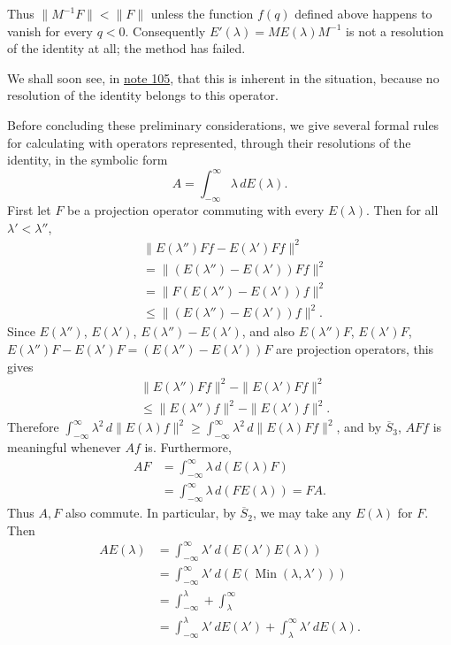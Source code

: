 \documentclass[fontsize=13pt,twoside,openany,headings=normal,parskip=false,bookmarkpackage=false,DIV=calc]{scrbook}
\begin{document}
\hypertarget{origpage-73}{}%
Thus $\|M^{-1}F\|<\|F\|$ unless the function $f(q)$ defined above happens to vanish for every $q<0$. Consequently $E'(\lambda)=ME(\lambda)M^{-1}$ is not a resolution of the identity at all; the method has failed.

We shall soon see, in \hyperlink{note-105}{note 105}, that this is inherent in the situation, because no resolution of the identity belongs to this operator.

Before concluding these preliminary considerations, we give several formal rules for calculating with operators represented, through their resolutions of the identity, in the symbolic form
\[
A=\int_{-\infty}^{\infty}\lambda\,dE(\lambda).
\]
First let $F$ be a projection operator commuting with every $E(\lambda)$. Then for all $\lambda'<\lambda''$,
\begin{align*}
&\|E(\lambda'')Ff-E(\lambda')Ff\|^2\\
&=\|(E(\lambda'')-E(\lambda'))Ff\|^2\\
&=\|F(E(\lambda'')-E(\lambda'))f\|^2\\
&\leq\|(E(\lambda'')-E(\lambda'))f\|^2.
\end{align*}
Since $E(\lambda'')$, $E(\lambda')$, $E(\lambda'')-E(\lambda')$, and also $E(\lambda'')F$, $E(\lambda')F$, $E(\lambda'')F-E(\lambda')F=(E(\lambda'')-E(\lambda'))F$ are projection operators, this gives
\begin{align*}
&\|E(\lambda'')Ff\|^2-\|E(\lambda')Ff\|^2\\
&\leq\|E(\lambda'')f\|^2-\|E(\lambda')f\|^2.
\end{align*}
Therefore $\int_{-\infty}^{\infty}\lambda^2\,d\|E(\lambda)f\|^2\geq\int_{-\infty}^{\infty}\lambda^2\,d\|E(\lambda)Ff\|^2$, and by $\hyperref[cond:II.Sbar3]{\overline{S}_3}$, $AFf$ is meaningful whenever $Af$ is. Furthermore,
\begin{align*}
AF&=\int_{-\infty}^{\infty}\lambda\,d(E(\lambda)F)\\
&=\int_{-\infty}^{\infty}\lambda\,d(FE(\lambda))=FA.
\end{align*}
Thus $A,F$ also commute. In particular, by $\hyperref[cond:II.Sbar2]{\overline{S}_2}$, we may take any $E(\lambda)$ for $F$. Then
\begin{align*}
AE(\lambda)&=\int_{-\infty}^{\infty}\lambda'\,d(E(\lambda')E(\lambda))\\
&=\int_{-\infty}^{\infty}\lambda'\,d(E(\operatorname{Min}(\lambda,\lambda')))\\
&=\int_{-\infty}^{\lambda}+\int_\lambda^{\infty}\\
&=\int_{-\infty}^{\lambda}\lambda'\,dE(\lambda')+\int_\lambda^{\infty}\lambda'\,dE(\lambda).
\end{align*}
\end{document}
